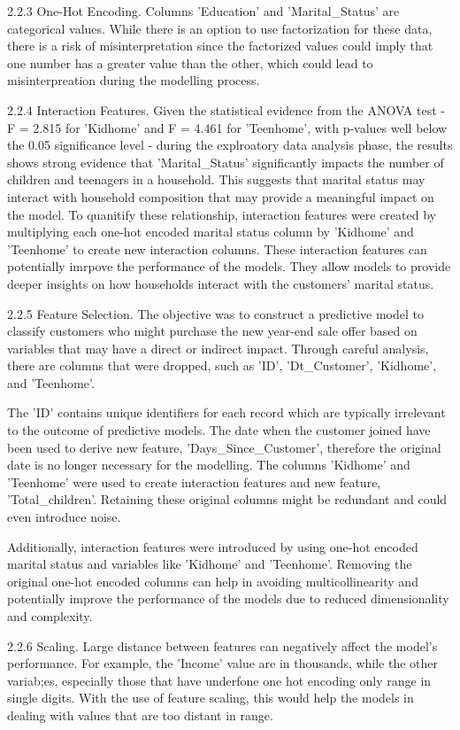 2.2.3 One-Hot Encoding. Columns 'Education' and 'Marital_Status' are categorical values. While there is an option to use factorization for these data, there is a risk of misinterpretation since the factorized values could imply that one number has a greater value than the other, which could lead to misinterpreation during the modelling process. 

2.2.4 Interaction Features. Given the statistical evidence from the ANOVA test - F = 2.815 for 'Kidhome' and F = 4.461 for 'Teenhome', with p-values well below the 0.05 significance level - during the explroatory data analysis phase, the results shows strong evidence that 'Marital_Status' significantly impacts the number of children and teenagers in a household. This suggests that marital status may interact with household composition that may provide a meaningful impact on the model. To quanitify these relationship, interaction features were created by multiplying each one-hot encoded marital status column by 'Kidhome' and 'Teenhome' to create new interaction columns. These interaction features can potentially imrpove the performance of the models. They allow models to provide deeper insights on how households interact with the customers' marital status.

2.2.5 Feature Selection. The objective was to construct a predictive model to classify customers who might purchase the new year-end sale offer based on variables that may have a direct or indirect impact. Through careful analysis, there are columns that were dropped, such as 'ID', 'Dt_Customer', 'Kidhome', and 'Teenhome'. 

The 'ID' contains unique identifiers for each record which are typically irrelevant to the outcome of predictive models. The date when the customer joined have been used to derive new feature, 'Days_Since_Customer', therefore the original date is no longer necessary for the modelling. The columns 'Kidhome' and 'Teenhome' were used to create interaction features and new feature, 'Total_children'. Retaining these original columns might be redundant and could even introduce noise.

Additionally, interaction features were introduced by  using one-hot encoded marital status and variables like 'Kidhome' and 'Teenhome'. Removing the original one-hot encoded columns can help in avoiding multicollinearity and potentially improve the performance of the models due to reduced dimensionality and complexity.

2.2.6 Scaling. Large distance between features can negatively affect the model's performance. For example, the 'Income' value are in thousands, while the other variab;es, especially those that have underfone one hot encoding only range in single digits. With the use of feature scaling, this would help the models in dealing with values that are too distant in range.

